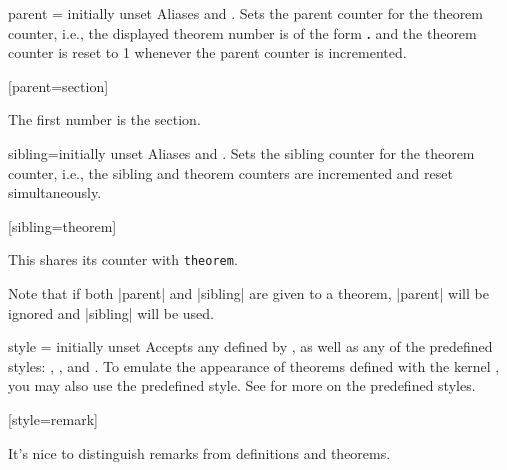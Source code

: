 \documentclass{ltxdoc}
\begin{document}
\begin{docKey}{parent}
  {=}
  {initially unset}
Aliases  and .
Sets the parent counter for the theorem counter, i.e., the displayed theorem number is of the form \textbf{.} and the theorem counter is reset to 1 whenever the parent counter is incremented.

\begin{codepreamble}
[parent=section]
\end{codepreamble}

\begin{keythmscode}[withpreamble]
\begin{conjecture}
The first number is the section.
\end{conjecture}
\end{keythmscode}

\end{docKey}

\begin{docKey}{sibling}{=}{initially unset}
Aliases  and .
Sets the sibling counter for the theorem counter, i.e., the sibling and theorem counters are incremented and reset simultaneously.

\begin{codepreamble}
[sibling=theorem]
\end{codepreamble}

\begin{keythmscode}[withpreamble]
\begin{lemma}
This shares its counter with \texttt{theorem}.
\end{lemma}
\end{keythmscode}

Note that if both |parent| and |sibling| are given to a theorem, |parent| will be ignored and |sibling| will be used.
\end{docKey}

\begin{docKey}{style}
  {=}
  {initially unset}
Accepts any  defined by , as well as any of the predefined  styles: , , and .
To emulate the appearance of theorems defined with the kernel , you may also use the predefined  style.
See  for more on the predefined styles.

\begin{codepreamble}
[style=remark]
\end{codepreamble}

\begin{keythmscode}[withpreamble]
\begin{remark}
It's nice to distinguish remarks from definitions and theorems.
\end{remark}
\end{keythmscode}

\end{docKey}
\end{document}
